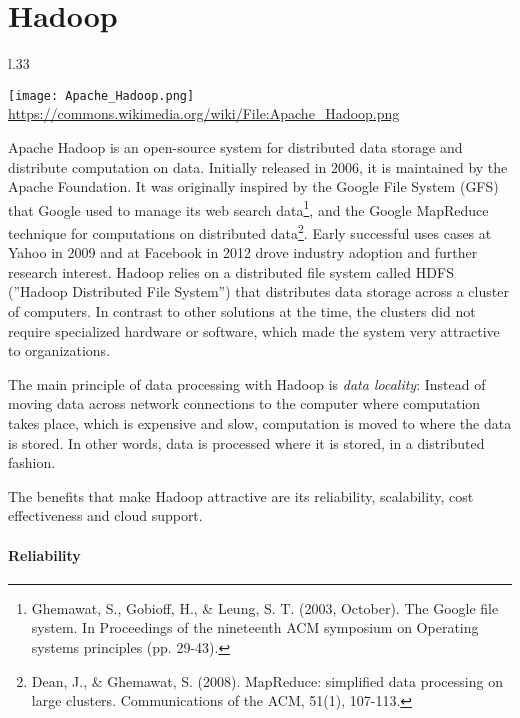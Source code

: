 \FloatBarrier

\section{Hadoop}

\begin{wrapfigure}{l}{.33\textwidth}
\begin{center}
\texttt{[image: Apache\_Hadoop.png]}
\scriptsize \url{https://commons.wikimedia.org/wiki/File:Apache_Hadoop.png}
\end{center}
\end{wrapfigure}

Apache Hadoop is an open-source system for distributed data storage and distribute computation on data. Initially released in 2006, it is maintained by the Apache Foundation. It was originally inspired by the Google File System (GFS) that Google used to manage its web search data\footnote{Ghemawat, S., Gobioff, H., \& Leung, S. T. (2003, October). The Google file system. In Proceedings of the nineteenth ACM symposium on Operating systems principles (pp. 29-43).}, and the Google MapReduce technique for computations on distributed data\footnote{Dean, J., \& Ghemawat, S. (2008). MapReduce: simplified data processing on large clusters. Communications of the ACM, 51(1), 107-113.}. Early successful uses cases at Yahoo in 2009 and at Facebook in 2012 drove industry adoption and further research interest. Hadoop relies on a distributed file system called HDFS (''Hadoop Distributed File System'') that distributes data storage across a cluster of computers. In contrast to other solutions at the time, the clusters did not require specialized hardware or software, which made the system very attractive to organizations. 

The main principle of data processing with Hadoop is \emph{data locality}: Instead of moving data across network connections to the computer where computation takes place, which is expensive and slow, computation is moved to where the data is stored. In other words, data is processed where it is stored, in a distributed fashion.

The benefits that make Hadoop attractive are its reliability, scalability, cost effectiveness and cloud support. 

\paragraph*{Reliability}

